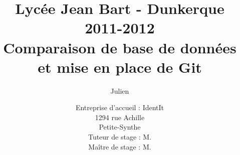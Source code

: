 \documentclass[12pt,a4paper]{report}
\title
{
	\normalsize{Lycée Jean Bart - Dunkerque\\
	2011-2012}\\
	\vspace{15mm}
	\Huge{Comparaison de base de données\\
    et mise en place de Git\\
    \vspace{15mm}}
}
\author{\bsc{Stechele} Julien\\
	\vspace{45mm}
}
\date{
	\normalsize{Entreprise d'accueil : IdentIt\\
    1294 rue Achille \bsc{Pérès}\\
	Petite-Synthe\\
	\vspace{5mm}
    Tuteur de stage : M.\bsc{Anselin}\\
	Maître de stage : M.\bsc{Dubourg}
	}
}
\begin{document}
\maketitle

\begin{onehalfspace}



\renewcommand{\contentsname}{Sommaire}

\tableofcontents









\end{onehalfspace}
\end{document}
